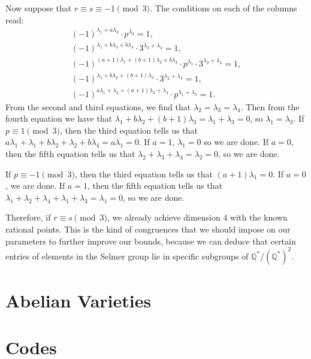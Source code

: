 \documentclass[a4paper, 12pt]{amsart}
\theoremstyle{definition}
\theoremstyle{plain}
\theoremstyle{plain}
\theoremstyle{plain}
\theoremstyle{plain}
\theoremstyle{remark}
\theoremstyle{remark}
\theoremstyle{plain}
\newcommand{\Q}{\mathbb{Q}}
\begin{document}
Now suppose that $r\equiv s\equiv-1\pmod3$. The conditions on each of the columns read:
\begin{align*}
	(-1)^{\lambda_1+a\lambda_3}\cdot p^{\lambda_3}=1,\\
	(-1)^{\lambda_1+b\lambda_3+b\lambda_4}\cdot 3^{\lambda_3+\lambda_4}=1,\\
	(-1)^{(a+1)\lambda_1+(b+1)\lambda_2+b\lambda_4}\cdot p^{\lambda_1}\cdot 3^{\lambda_2+\lambda_4}=1,\\
	(-1)^{\lambda_1+b\lambda_2+(b+1)\lambda_3}\cdot 3^{\lambda_2+\lambda_3}=1,\\
	(-1)^{a\lambda_1+\lambda_2+(a+1)\lambda_3+\lambda_4}\cdot p^{\lambda_1+\lambda_3}=1.
\end{align*}
From the second and third equations, we find that $\lambda_2=\lambda_3=\lambda_4$. Then from the fourth equation we have that $\lambda_1+b\lambda_2+(b+1)\lambda_3=\lambda_1+\lambda_3=0$, so $\lambda_1=\lambda_3$. If $p\equiv1\pmod3$, then the third equation tells us that $a\lambda_1+\lambda_1+b\lambda_2+\lambda_2+b\lambda_4=a\lambda_1=0$. If $a=1$, $\lambda_1=0$ so we are done. If $a=0$, then the fifth equation tells us that $\lambda_2+\lambda_3+\lambda_4=\lambda_2=0$, so we are done.

If $p\equiv-1\pmod3$, then the third equation tells us that $(a+1)\lambda_1=0$. If $a=0$, we are done. If $a=1$, then the fifth equation tells us that $\lambda_1+\lambda_2+\lambda_4+\lambda_1+\lambda_3=\lambda_1=0$, so we are done.

Therefore, if $r\equiv s\pmod3$, we already achieve dimension 4 with the known rational points. This is the kind of congruences that we should impose on our parameters to further improve our bounds, because we can deduce that certain entries of elements in the Selmer group lie in specific subgroups of $\Q^*/(\Q^*)^2$.
	\newpage
	\thispagestyle{plain}
	\appendix
	\section{Abelian Varieties}\label{appendixA}
	
	
	\newpage
	\thispagestyle{plain}
	\section{Codes}
	
	
	\newpage
	\pagestyle{empty}
	
	
	\nocite{*}
\end{document}
